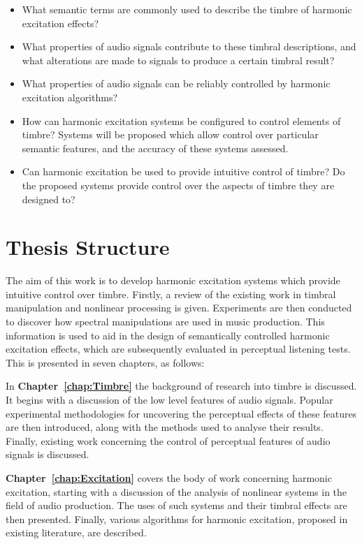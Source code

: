 	\begin{itemize}
		\item What semantic terms are commonly used to describe the timbre of harmonic excitation effects? 
		\item What properties of audio signals contribute to these timbral descriptions, and what alterations are
		      made to signals to produce a certain timbral result?
		\item What properties of audio signals can be reliably controlled by harmonic excitation algorithms?
		\item How can harmonic excitation systems be configured to control elements of timbre? Systems will be
		      proposed which allow control over particular semantic features, and the accuracy of these systems
		      assessed.
		\item Can harmonic excitation be used to provide intuitive control of timbre? Do the proposed systems
		      provide control over the aspects of timbre they are designed to?
	\end{itemize}

\section{Thesis Structure}
\label{sec:Introduction-ThesisStructure}
	The aim of this work is to develop harmonic excitation systems which provide intuitive control over timbre.
	Firstly, a review of the existing work in timbral manipulation and nonlinear processing is given. Experiments are
	then conducted to discover how spectral manipulations are used in music production. This information is used to aid
	in the design of semantically controlled harmonic excitation effects, which are subsequently evaluated in perceptual
	listening tests. This is presented in seven chapters, as follows:

	In {\bf{Chapter~\ref{chap:Timbre}}} the background of research into timbre is discussed. It begins with a discussion
	of the low level features of audio signals. Popular experimental methodologies for uncovering the perceptual effects
	of these features are then introduced, along with the methods used to analyse their results. Finally, existing work
	concerning the control of perceptual features of audio signals is discussed.

	{\bf{Chapter~\ref{chap:Excitation}}} covers the body of work concerning harmonic excitation, starting with a
	discussion of the analysis of nonlinear systems in the field of audio production. The uses of such systems and their
	timbral effects are then presented. Finally, various algorithms for harmonic excitation, proposed in existing
	literature, are described.

